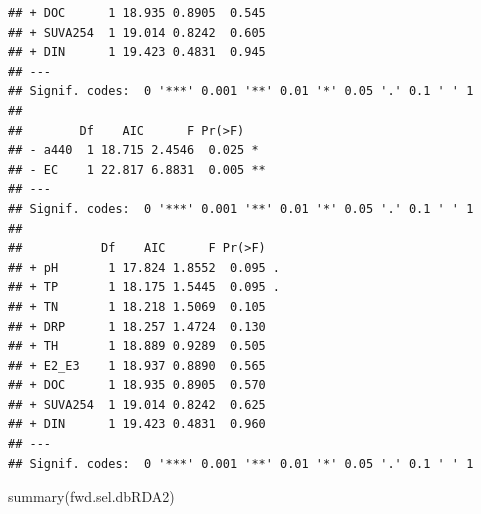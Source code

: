 \documentclass[
]{book}
\newenvironment{Shaded}{\begin{snugshade}}{\end{snugshade}}
\newcommand{\FunctionTok}[1]{\textcolor[rgb]{0.00,0.00,0.00}{#1}}
\newcommand{\NormalTok}[1]{#1}
\begin{document}
\begin{verbatim}
## + DOC      1 18.935 0.8905  0.545  
## + SUVA254  1 19.014 0.8242  0.605  
## + DIN      1 19.423 0.4831  0.945  
## ---
## Signif. codes:  0 '***' 0.001 '**' 0.01 '*' 0.05 '.' 0.1 ' ' 1
## 
##        Df    AIC      F Pr(>F)   
## - a440  1 18.715 2.4546  0.025 * 
## - EC    1 22.817 6.8831  0.005 **
## ---
## Signif. codes:  0 '***' 0.001 '**' 0.01 '*' 0.05 '.' 0.1 ' ' 1
## 
##           Df    AIC      F Pr(>F)  
## + pH       1 17.824 1.8552  0.095 .
## + TP       1 18.175 1.5445  0.095 .
## + TN       1 18.218 1.5069  0.105  
## + DRP      1 18.257 1.4724  0.130  
## + TH       1 18.889 0.9289  0.505  
## + E2_E3    1 18.937 0.8890  0.565  
## + DOC      1 18.935 0.8905  0.570  
## + SUVA254  1 19.014 0.8242  0.625  
## + DIN      1 19.423 0.4831  0.960  
## ---
## Signif. codes:  0 '***' 0.001 '**' 0.01 '*' 0.05 '.' 0.1 ' ' 1
\end{verbatim}

\begin{Shaded}
\begin{Highlighting}[]
\FunctionTok{summary}\NormalTok{(fwd.sel.dbRDA2)}
\end{Highlighting}
\end{Shaded}
\end{document}
